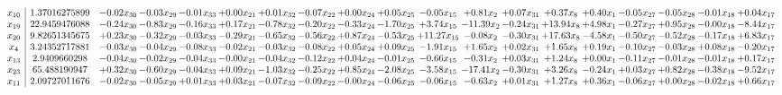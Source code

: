 \documentclass[9pt]{article}
\begin{document}
 \[\begin{array}{c| c c@{\hskip 2pt} c@{\hskip 2pt} c@{\hskip 2pt} c@{\hskip 2pt} c@{\hskip 2pt} c@{\hskip 2pt} c@{\hskip 2pt} c@{\hskip 2pt} c@{\hskip 2pt} c@{\hskip 2pt} c@{\hskip 2pt} c@{\hskip 2pt} c@{\hskip 2pt} c@{\hskip 2pt} c@{\hskip 2pt} c@{\hskip 2pt} c@{\hskip 2pt} }
 x_{10}   &  1.37016275899 & -0.02 x_{30} & -0.03 x_{29} & -0.01 x_{33} & +  0.00 x_{21} & +  0.01 x_{32} & -0.07 x_{22} & +  0.00 x_{24} & +  0.05 x_{25} & -0.05 x_{15} & +  0.81 x_{2} & +  0.07 x_{31} & +  0.37 x_{8} & +  0.40 x_{1} & -0.05 x_{27} & -0.05 x_{28} & -0.01 x_{18} & +  0.04 x_{17}\\
 x_{19}   &  22.9459476088 & -0.24 x_{30} & -0.83 x_{29} & -0.16 x_{33} & +  0.17 x_{21} & -0.78 x_{32} & -0.20 x_{22} & -0.33 x_{24} & -1.70 x_{25} & +  3.74 x_{15} & -11.39 x_{2} & -0.24 x_{31} & + 13.94 x_{8} & +  4.98 x_{1} & -0.27 x_{27} & +  0.95 x_{28} & -0.00 x_{18} & -8.44 x_{17}\\
 x_{20}   &  9.82651345675 & +  0.23 x_{30} & -0.32 x_{29} & -0.03 x_{33} & -0.29 x_{21} & -0.65 x_{32} & -0.56 x_{22} & +  0.87 x_{24} & -0.53 x_{25} & + 11.27 x_{15} & -0.08 x_{2} & -0.30 x_{31} & + 17.63 x_{8} & -4.58 x_{1} & -0.50 x_{27} & -0.52 x_{28} & -0.17 x_{18} & +  6.83 x_{17}\\
 x_{4}   &  3.24352717881 & -0.03 x_{30} & -0.04 x_{29} & -0.08 x_{33} & -0.02 x_{21} & -0.03 x_{32} & -0.08 x_{22} & +  0.05 x_{24} & +  0.09 x_{25} & -1.91 x_{15} & +  1.65 x_{2} & +  0.02 x_{31} & +  1.65 x_{8} & +  0.19 x_{1} & -0.10 x_{27} & -0.03 x_{28} & +  0.08 x_{18} & -0.20 x_{17}\\
 x_{13}   &  2.9409660298 & -0.04 x_{30} & -0.02 x_{29} & -0.04 x_{33} & -0.00 x_{21} & -0.04 x_{32} & -0.12 x_{22} & +  0.04 x_{24} & -0.01 x_{25} & -0.66 x_{15} & -0.31 x_{2} & +  0.03 x_{31} & +  1.24 x_{8} & +  0.00 x_{1} & -0.11 x_{27} & -0.01 x_{28} & -0.01 x_{18} & +  0.17 x_{17}\\
 x_{23}   &  65.488190947 & +  0.32 x_{30} & -0.60 x_{29} & -0.04 x_{33} & +  0.09 x_{21} & -1.03 x_{32} & -0.25 x_{22} & +  0.85 x_{24} & -2.08 x_{25} & -3.58 x_{15} & -17.41 x_{2} & -0.30 x_{31} & +  3.26 x_{8} & -0.24 x_{1} & +  0.03 x_{27} & +  0.82 x_{28} & -0.38 x_{18} & -9.52 x_{17}\\
 x_{11}   &  2.09727011676 & -0.02 x_{30} & -0.05 x_{29} & +  0.01 x_{33} & +  0.03 x_{21} & -0.07 x_{32} & -0.09 x_{22} & -0.00 x_{24} & -0.06 x_{25} & -0.06 x_{15} & -0.63 x_{2} & +  0.01 x_{31} & +  1.27 x_{8} & +  0.36 x_{1} & -0.06 x_{27} & +  0.00 x_{28} & -0.02 x_{18} & +  0.66 x_{17}\\

\end{array}\]
\end{document}
